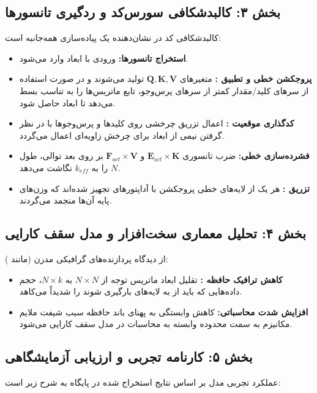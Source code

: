 \subsection*{بخش ۳: کالبدشکافی سورس‌کد و ردگیری تانسورها }
کالبدشکافی کد در  نشان‌دهنده یک پیاده‌سازی همه‌جانبه است:
\begin{itemize}
\item \textbf{استخراج تانسورها:} ورودی با ابعاد \lr{$[B, N, D]$} وارد می‌شود.
\item \textbf{پروجکشن خطی و تطبیق :} متغیرهای $\mathbf{Q}, \mathbf{K}, \mathbf{V}$ تولید می‌شوند و در صورت استفاده از سرهای کلید/مقدار کمتر از سرهای پرس‌وجو، تابع  ماتریس‌ها را به تناسب بسط می‌دهد تا ابعاد \lr{$[B, H, N, d]$} حاصل شود.
\item \textbf{کدگذاری موقعیت :} اعمال تزریق چرخشی روی کلیدها و پرس‌وجوها با در نظر گرفتن نیمی از ابعاد برای چرخش زاویه‌ای اعمال می‌گردد.
\item \textbf{فشرده‌سازی خطی:} ضرب تانسوری $\mathbf{E}_{act} \times \mathbf{K}$ و $\mathbf{F}_{act} \times \mathbf{V}$ بر روی بعد توالی، طول $N$ را به $k_{eff}$ نگاشت می‌دهد.
\item \textbf{تزریق :} هر یک از لایه‌های خطی پروجکشن با آداپتورهای  تجهیز شده‌اند که وزن‌های پایه آن‌ها منجمد می‌گردند.
\end{itemize}

\subsection*{بخش ۴: تحلیل معماری سخت‌افزار و مدل سقف کارایی }
از دیدگاه پردازنده‌های گرافیکی مدرن (مانند ):
\begin{itemize}
\item \textbf{کاهش ترافیک حافظه :} تقلیل ابعاد ماتریس توجه از $N \times N$ به $N \times k$، حجم داده‌هایی که باید از  به لایه‌های  بارگیری شوند را شدیداً می‌کاهد.
\item \textbf{افزایش شدت محاسباتی:} کاهش وابستگی به پهنای باند حافظه  سبب شیفت ملایم مکانیزم به سمت محدوده وابسته به محاسبات  در مدل سقف کارایی می‌شود.
\end{itemize}

\subsection*{بخش ۵: کارنامه تجربی و ارزیابی آزمایشگاهی }
عملکرد تجربی مدل بر اساس نتایج استخراج شده در پایگاه  به شرح زیر است:

